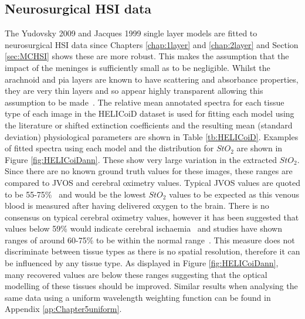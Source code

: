 \subsection{Neurosurgical HSI data}
The Yudovsky 2009 and Jacques 1999 single layer models are fitted to neurosurgical HSI data since Chapters \ref{chap:1layer} and \ref{chap:2layer} and Section \ref{sec:MCHSI} shows these are more robust.
This makes the assumption that the impact of the meninges is sufficiently small as to be negligible. Whilst the arachnoid and pia layers are known to have scattering and absorbance properties, they are very thin layers and so appear highly transparent allowing this assumption to be made~\citep{Ghannam2023}.
The relative mean annotated spectra for each tissue type of each image in the HELICoiD dataset is used for fitting each model using the literature or shifted extinction coefficients and the resulting mean (standard deviation) physiological parameters are shown in Table \ref{tb:HELICoiD}. Examples of fitted spectra using each model and the distribution for $StO_2$ are shown in Figure \ref{fig:HELICoiDann}. These show very large variation in the extracted $StO_2$. Since there are no known ground truth values for these images, these ranges are compared to JVOS and cerebral oximetry values. Typical JVOS values are quoted to be 55-75\%~\citep{Raith2020, Zhong2021} and would be the lowest $StO_2$ values to be expected as this venous blood is measured after having delivered oxygen to the brain. There is no consensus on typical cerebral oximetry values, however it has been suggested that values below 59\% would indicate cerebral ischaemia~\citep{Zhong2021} and studies have shown ranges of around 60-75\% to be within the normal range~\citep{Lian2020}. This measure does not discriminate between tissue types as there is no spatial resolution, therefore it can be influenced by any tissue type. As displayed in Figure \ref{fig:HELICoiDann}, many recovered values are below these ranges suggesting that the optical modelling of these tissues should be improved. Similar results when analysing the same data using a uniform wavelength weighting function can be found in Appendix \ref{ap:Chapter5uniform}.

